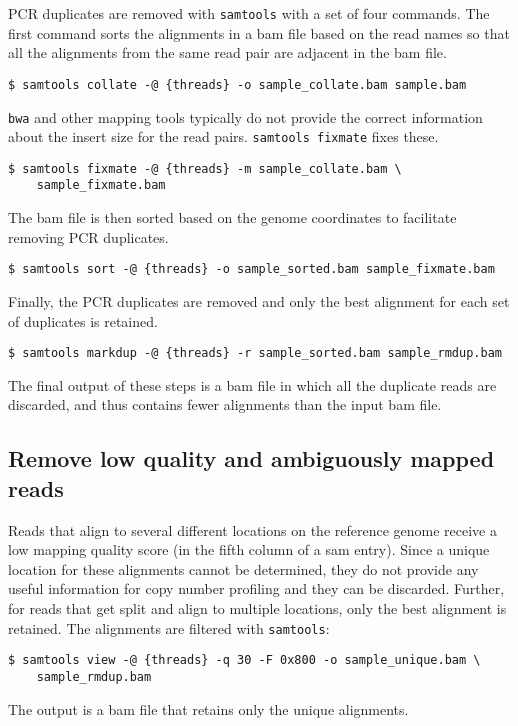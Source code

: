 \documentclass[11pt]{article}
\newcommand{\prog}[1]{\texttt{#1}}
\begin{document}
PCR duplicates are removed with \prog{samtools} with a set of four
commands. The first command sorts the alignments in a bam file based on
the read names so that all the alignments from the same read pair are
adjacent in the bam file.
\begin{verbatim}
$ samtools collate -@ {threads} -o sample_collate.bam sample.bam
\end{verbatim}
%
\prog{bwa} and other mapping tools typically do not provide the correct
information about the insert size for the read pairs. \prog{samtools
fixmate} fixes these.
\begin{verbatim}
$ samtools fixmate -@ {threads} -m sample_collate.bam \
    sample_fixmate.bam
\end{verbatim}
%
The bam file is then sorted based on the genome coordinates to
facilitate removing PCR duplicates.
\begin{verbatim}
$ samtools sort -@ {threads} -o sample_sorted.bam sample_fixmate.bam
\end{verbatim}
%
Finally, the PCR duplicates are removed and only the best alignment for
each set of duplicates is retained.
\begin{verbatim}
$ samtools markdup -@ {threads} -r sample_sorted.bam sample_rmdup.bam
\end{verbatim}

The final output of these steps is a bam file in which all the duplicate
reads are discarded, and thus contains fewer alignments than the input bam
file.


\subsection{Remove low quality and ambiguously mapped reads}
Reads that align to several different locations on the reference
genome receive a low mapping quality score (in the fifth column of a
sam entry). Since a unique location for these alignments cannot be
determined, they do not provide any useful information for copy number
profiling and they can be discarded. Further, for reads that get split
and align to multiple locations, only the best alignment is retained. The
alignments are filtered with \prog{samtools}:
\begin{verbatim}
$ samtools view -@ {threads} -q 30 -F 0x800 -o sample_unique.bam \
    sample_rmdup.bam
\end{verbatim}
The output is a bam file that retains only the unique alignments.
\end{document}
